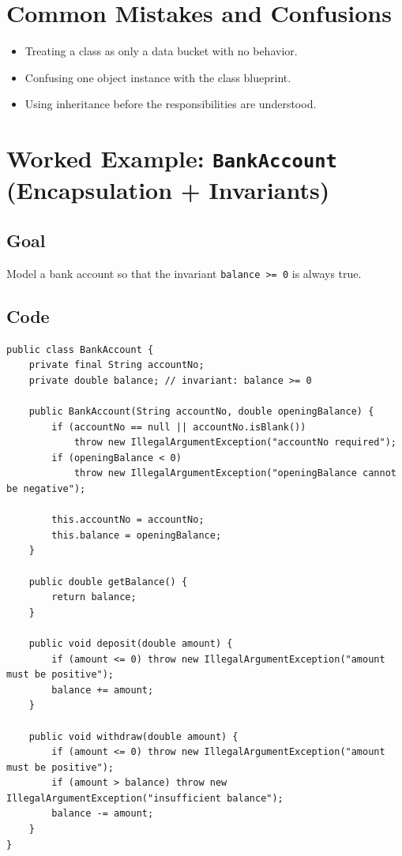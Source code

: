 \documentclass[11pt]{article}
\begin{document}
\section{Common Mistakes and Confusions}
\begin{itemize}
  \item Treating a class as only a data bucket with no behavior.
  \item Confusing one object instance with the class blueprint.
  \item Using inheritance before the responsibilities are understood.
\end{itemize}
\notesources{\OOPSUnitISources}

\section{Worked Example: \texttt{BankAccount} (Encapsulation + Invariants)}
\subsection*{Goal}
Model a bank account so that the invariant \texttt{balance >= 0} is always true.

\subsection*{Code}
\begin{lstlisting}
public class BankAccount {
    private final String accountNo;
    private double balance; // invariant: balance >= 0

    public BankAccount(String accountNo, double openingBalance) {
        if (accountNo == null || accountNo.isBlank())
            throw new IllegalArgumentException("accountNo required");
        if (openingBalance < 0)
            throw new IllegalArgumentException("openingBalance cannot be negative");

        this.accountNo = accountNo;
        this.balance = openingBalance;
    }

    public double getBalance() {
        return balance;
    }

    public void deposit(double amount) {
        if (amount <= 0) throw new IllegalArgumentException("amount must be positive");
        balance += amount;
    }

    public void withdraw(double amount) {
        if (amount <= 0) throw new IllegalArgumentException("amount must be positive");
        if (amount > balance) throw new IllegalArgumentException("insufficient balance");
        balance -= amount;
    }
}
\end{lstlisting}
\end{document}

